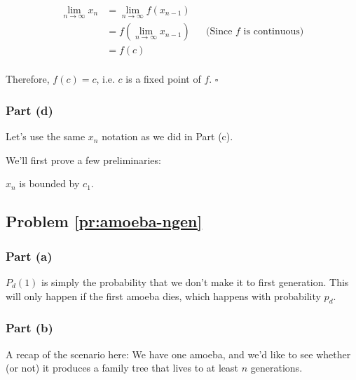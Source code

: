 \begin{align*}
\lim_{n \rightarrow \infty} x_n &= \lim_{n \rightarrow \infty} f(x_{n-1}) \\
&= f(\lim_{n \rightarrow \infty} x_{n-1}) && \text{(Since $f$ is continuous)} \\
&= f(c) \\
\end{align*}


Therefore, $f(c) = c$, i.e. $c$ is a fixed point of $f$. $\square$

\subsubsection{Part (d)}

Let's use the same $x_n$ notation as we did in Part (c).

We'll first prove a few preliminaries:

\begin{lemma}
${x_n}$ is bounded by $c_1$.
\end{lemma}





\subsection{Problem \ref{pr:amoeba-ngen}}

\subsubsection{Part (a)}

$P_d(1)$ is simply the probability that we don't make it to first generation. This will only happen if the first amoeba dies, which happens with probability $p_d$.



\subsubsection{Part (b)}

A recap of the scenario here: We have one amoeba, and we'd like to see whether (or not) it produces a family tree that lives to at least $n$ generations.


